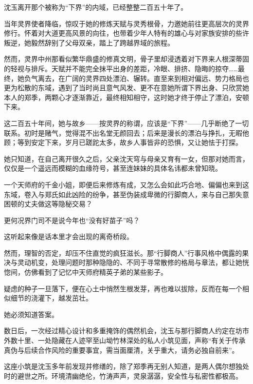 \vspace{2em}

沈玉离开那个被称为“下界”的内域，已经整整二百五十年了。

当年灵界使者降临，惊叹于她的修炼天赋与灵秀根骨，力邀她前往更高层次的灵界修行。怀着对大道更高风景的向往，也带着少年人特有的雄心与对家族安排的些许叛逆，她毅然辞别了父母双亲，踏上了跨越界域的旅程。

然而，灵界中州那看似繁华鼎盛的修真文明，骨子里却浸透着对下界来人根深蒂固的轻视与排斥。天赋并不能完全抹平出身的差距，冷眼、排挤、隐晦的掠夺……最终，她负气离去，在广阔的灵界四处漂泊、辗转。直至来到相对偏远、势力格局也更为松散的东域，遇到了当时尚且意气风发、更不在意她所谓下界出身、只欣赏她本人的郑季，两颗心才逐渐靠近，最终相知相守，这时她才终于停止了漂泊，安顿下来。

这二百五十年间，她与故乡——按灵界的称谓，应该是“下界”——几乎断绝了一切联系。初时是赌气，觉得混不出名堂无颜回去；后来是漫长的漂泊与挣扎，无暇他顾；等到安定下来，岁月已蹉跎太多，故乡人事皆非的恐惧，又让她怯于打探。

她只知道，在自己离开很久之后，父亲沈天穹与母亲又育有一女，但那对她而言，仅仅是一个遥远而模糊的血缘符号，甚至连妹妹的具体名讳都未曾知晓。

一个天师府的千金小姐，即便后来修炼有成，又怎么会如此巧合地、偏偏也来到这东域，卷入与郑氏如此凶险的纷争，甚至伪装成卑微的行脚商人，来与自己那失意困顿的丈夫做这等隐秘交易？

更何况界门司不是说今年也“没有好苗子”吗？

这听起来像是话本里才会出现的离奇桥段。

然而，理智的否定，却压不住直觉的疯狂滋长。那“行脚商人”行事风格中偶露的果决与灵动机变，处理问题时那种隐隐的、不同于寻常散修的格局与章法，都让她恍惚间，仿佛看到了记忆中天师府精英子弟的某些影子。

疑虑的种子一旦落下，便在心土中悄然生根发芽，再也难以拔除，反而在每一个相似细节的浇灌下，越发茁壮。

她必须知道答案。

\vspace{2em}

数日后，一次经过精心设计和多重掩饰的偶然机会，沈玉与那行脚商人约定在坊市外数十里、一处隐藏在人迹罕至山坳竹林深处的私人小筑见面，声称“有关于传承真伪与后续合作风险的重要事宜，需当面厘清，关乎重大，请务必独自前来”。

这座小筑是沈玉多年前发现并修缮的，除了郑季再无别人知道，是两人偶尔想独处时的避世之所。环境清幽绝伦，竹涛声声，灵泉潺潺，安全性与私密性都极高。

